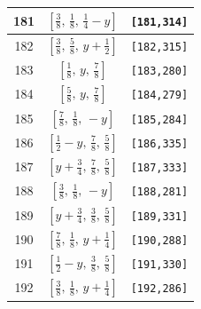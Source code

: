 \documentclass[fleqn,8pt]{jsarticle}
\begin{document}
\begin{longtable}{ccc}
181 & $\left[ \frac{3}{8},\, \frac{1}{8},\, \frac{1}{4} - y \right]$ & {\tt [181,314]} \\ \hline
182 & $\left[ \frac{3}{8},\, \frac{5}{8},\, y + \frac{1}{2} \right]$ & {\tt [182,315]} \\ \hline
183 & $\left[ \frac{1}{8},\, y,\, \frac{7}{8} \right]$ & {\tt [183,280]} \\ \hline
184 & $\left[ \frac{5}{8},\, y,\, \frac{7}{8} \right]$ & {\tt [184,279]} \\ \hline
185 & $\left[ \frac{7}{8},\, \frac{1}{8},\, - y \right]$ & {\tt [185,284]} \\ \hline
186 & $\left[ \frac{1}{2} - y,\, \frac{7}{8},\, \frac{5}{8} \right]$ & {\tt [186,335]} \\ \hline
187 & $\left[ y + \frac{3}{4},\, \frac{7}{8},\, \frac{5}{8} \right]$ & {\tt [187,333]} \\ \hline
188 & $\left[ \frac{3}{8},\, \frac{1}{8},\, - y \right]$ & {\tt [188,281]} \\ \hline
189 & $\left[ y + \frac{3}{4},\, \frac{3}{8},\, \frac{5}{8} \right]$ & {\tt [189,331]} \\ \hline
190 & $\left[ \frac{7}{8},\, \frac{1}{8},\, y + \frac{1}{4} \right]$ & {\tt [190,288]} \\ \hline
191 & $\left[ \frac{1}{2} - y,\, \frac{3}{8},\, \frac{5}{8} \right]$ & {\tt [191,330]} \\ \hline
192 & $\left[ \frac{3}{8},\, \frac{1}{8},\, y + \frac{1}{4} \right]$ & {\tt [192,286]} \\
\end{longtable}
\renewcommand{\arraystretch}{1.2}
\end{document}
